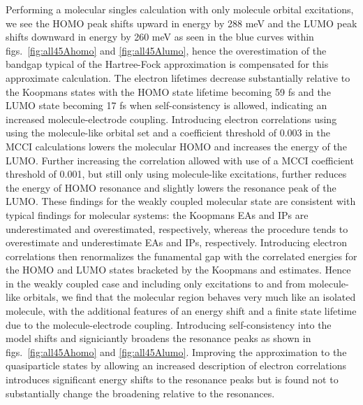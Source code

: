 Performing a molecular singles calculation with only molecule orbital
excitations, we see the HOMO peak shifts upward in energy by 288 meV and
the LUMO peak shifts downward in energy by 260 meV as seen in the blue
curves within figs.~\ref{fig:all45Ahomo} and \ref{fig:all45Alumo}, hence
the overestimation of the bandgap typical of the Hartree-Fock approximation
is compensated for this approximate \dscf calculation.
The electron lifetimes decrease substantially relative to the Koopmans
states with the HOMO state lifetime becoming 59 fs and the LUMO state
becoming 17 fs when self-consistency is allowed, indicating an increased
molecule-electrode coupling. 
Introducing electron correlations using using the molecule-like orbital
set and a coefficient threshold of 0.003 in the MCCI calculations lowers
the molecular HOMO and increases the energy of the LUMO. Further increasing
the correlation allowed with use of a MCCI coefficient threshold of 0.001,
but still only using molecule-like excitations, further reduces the energy
of HOMO resonance and slightly lowers the resonance peak of the LUMO.
These findings for the weakly coupled molecular state are consistent with
typical findings for molecular systems: the Koopmans EAs and IPs are 
underestimated and overestimated, respectively, whereas the \dscf
procedure tends to overestimate and underestimate EAs and IPs, respectively.
Introducing electron correlations then renormalizes the funamental gap
with the correlated energies for the HOMO and LUMO states bracketed by
the Koopmans and \dscf estimates.
Hence in the weakly coupled case and including only excitations to and
from molecule-like orbitals, we find that the molecular region behaves
very much like an isolated molecule, with the additional features of an
energy shift and a finite state lifetime due to the molecule-electrode
coupling.
Introducing self-consistency into the model shifts and signiciantly
broadens the resonance peaks as shown in figs.~\ref{fig:all45Ahomo} and
\ref{fig:all45Alumo}.
Improving the approximation to the quasiparticle states by allowing an
increased description of electron correlations introduces significant
energy shifts to the resonance peaks but is found not to substantially
change the broadening relative to the \dscf resonances.


